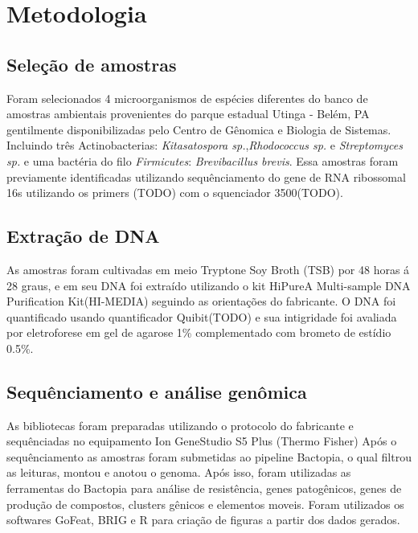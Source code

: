 \chapter{Metodologia}
\section{Seleção de amostras}
Foram selecionados 4 microorganismos de espécies diferentes do banco de amostras ambientais provenientes
do parque estadual Utinga - Belém, PA gentilmente disponibilizadas pelo Centro de Gênomica e Biologia de Sistemas.
Incluindo três Actinobacterias: \textit{Kitasatospora sp.},\textit{Rhodococcus sp.} e \textit{Streptomyces sp.}
e uma bactéria do filo \textit{Firmicutes}: \textit{Brevibacillus brevis}.
Essa amostras foram previamente identificadas utilizando sequênciamento do gene de RNA ribossomal 16s
utilizando os primers (TODO) com o squenciador 3500(TODO).

\section{Extração de DNA}
As amostras foram cultivadas em meio Tryptone Soy Broth (TSB) por 48 horas á 28 graus, e em
seu DNA foi extraído utilizando o kit HiPureA Multi-sample DNA Purification Kit(HI-MEDIA) seguindo as orientações
do fabricante. O DNA foi quantificado usando quantificador Quibit(TODO) e sua intigridade foi 
avaliada por eletroforese em gel de agarose 1\% complementado com brometo de estídio 0.5\%.

\section{Sequênciamento e análise genômica}
As bibliotecas foram preparadas utilizando o protocolo do fabricante e sequênciadas no equipamento
Ion GeneStudio S5 Plus (Thermo Fisher)
Após o sequênciamento as amostras foram submetidas ao pipeline Bactopia, o qual filtrou
as leituras, montou e anotou o genoma. Após isso, foram utilizadas as ferramentas do Bactopia 
para análise de resistência, genes patogênicos, genes de produção de compostos, clusters
gênicos e elementos moveis. 
Foram utilizados os softwares GoFeat, BRIG e R para criação de figuras a partir dos dados gerados.
